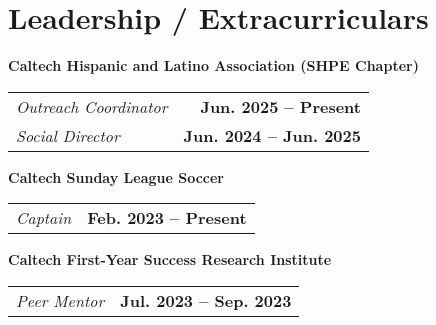\documentclass[letterpaper,11pt]{article}
\begin{document}
\section{Leadership / Extracurriculars}
    \textbf{Caltech Hispanic and Latino Association (SHPE Chapter)}
    \begin{tabularx}{\textwidth}{Xr}
        \textit{\small Outreach Coordinator} & \textbf{\small Jun. 2025 -- Present} \\
        \textit{\small Social Director} & \textbf{\small Jun. 2024 -- Jun. 2025}
    \end{tabularx}
    \vspace{2pt}
    \textbf{Caltech Sunday League Soccer}
    \begin{tabularx}{\textwidth}{Xr}
        \textit{\small Captain} & \textbf{\small Feb. 2023 -- Present}
    \end{tabularx}
    \vspace{2pt}
    \textbf{Caltech First-Year Success Research Institute}
    \begin{tabularx}{\textwidth}{Xr}
        \textit{\small Peer Mentor} & \textbf{\small Jul. 2023 -- Sep. 2023}
    \end{tabularx}
\end{document}
